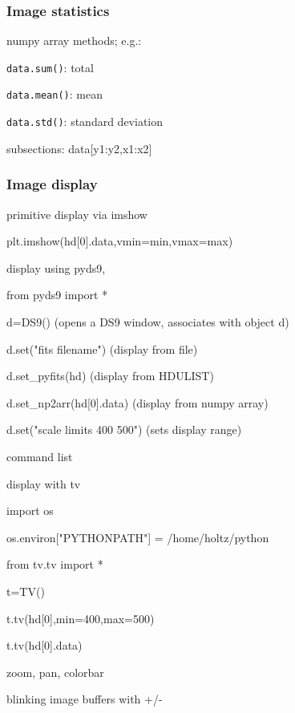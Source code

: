 \documentclass[12pt]{article}
\begin{document}
\subsubsection{Image statistics}
\begin{itemize*}
    \item numpy array methods; e.g.:
        \begin{itemize*}
            \item \texttt{data.sum()}: total
            \item \texttt{data.mean()}: mean
            \item \texttt{data.std()}: standard deviation
        \end{itemize*}
    \item subsections: data[y1:y2,x1:x2]
\end{itemize*}

\subsubsection{Image display}
\begin{itemize*}
    \item primitive display via imshow
        \begin{itemize*}
            \item plt.imshow(hd[0].data,vmin=min,vmax=max)
        \end{itemize*}
    \item display using pyds9,
        \begin{itemize*}
            \item from pyds9 import *
            \item d=DS9() (opens a DS9 window, associates with object d)
            \item d.set("fits filename") (display from file)
            \item d.set\_pyfits(hd) (display from HDULIST)
            \item d.set\_np2arr(hd[0].data) (display from numpy array)
            \item d.set("scale limits 400 500") (sets display range)
            \item command list
        \end{itemize*}
    \item display with tv
        \begin{itemize*}
            \item import os
            \item os.environ["PYTHONPATH"] = /home/holtz/python
            \item from tv.tv import *
            \item t=TV()
            \item t.tv(hd[0],min=400,max=500)
            \item t.tv(hd[0].data)
            \item zoom, pan, colorbar
            \item blinking image buffers with +/-
        \end{itemize*}
\end{itemize*}
\end{document}
